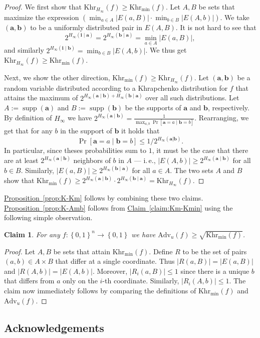\documentclass[11pt]{article}
\numberwithin{equation}{section}
\newtheorem{claim}[theorem]{Claim}
\theoremstyle{definition}
\theoremstyle{plain}
\newcommand{\ie}{i.\,e.}
\newcommand{\expref}[2]{\hyperref[#2]{#1~\ref{#2}}}
\theoremstyle{definition}\newtheorem{notation}[theorem]{Notation}\theoremstyle{plain}
\newcommand{\B}{\left\{ 0,1 \right \}}
\renewcommand{\a}{\boldsymbol{a}}
\renewcommand{\b}{\boldsymbol{b}}
\renewcommand{\i}{\boldsymbol{i}}
\newcommand{\Hm}{H_{\infty}}
\newcommand{\K}{\mathrm{Khr}}
\newcommand{\Km}{\K_{\Hm}}
\newcommand{\Kmin}{\K_{\min}}
\newcommand{\Amb}{\mathrm{Adv}_{u}}
\DeclareMathOperator{\supp}{supp}
\theoremstyle{definition}
\theoremstyle{plain}
\begin{document}
\begin{proof}
We first show that $\Km(f)\ge\Kmin(f)$. Let $A,B$ be sets that maximize
the expression $\left(\min_{a\in A}{|E(a,B)|}\cdot\min_{b\in B}{|E(A,b)|}\right)$.
We take $(\a,\b)$ to be a uniformly distributed pair in $E(A,B)$.
It is not hard to see that 
\[
2^{\Hm(\i\mid\a)}=2^{\Hm(\b\mid\a)}=\min_{a\in A}{|E(a,B)|},
\]
and similarly $2^{\Hm(\i\mid\b)}=\min_{b\in B}{|E(A,b)|}$. We thus
get $\Km(f)\ge\Kmin(f)$.

Next, we show the other direction, $\Kmin(f)\ge\Km(f)$. Let $(\a,\b)$
be a random variable distributed according to a Khrapchenko distribution
for $f$ that attains the maximum of $2^{\Hm(\a\mid\b)+\Hm(\b\mid\a)}$
over all such distributions. Let $A:=\supp(\a)$ and $B:=\supp(\b)$
be the supports of $\a$ and $\b$, respectively. By definition of
$\Hm$ we have $2^{\Hm(\a\mid\b)}=\frac{1}{\max_{a,b}\Pr[\a=a\mid\b=b]}$.
Rearranging, we get that for any $b$ in the support of $\b$ it holds
that 
\[
\Pr[\a=a\mid\b=b]\le1/2^{\Hm(\a|\b)}.
\]
In particular, since theses probabilities sum to $1$, it must be
the case that there are at least $2^{\Hm(\a\mid\b)}$ neighbors of
$b$ in $A$ --- \ie, $|E(A,b)|\ge2^{\Hm(\a\mid\b)}$ for all $b\in B$.
Similarly, $|E(a,B)|\ge2^{\Hm(\b\mid\a)}$ for all $a\in A$. The
two sets $A$ and $B$ show that $\Kmin(f)\ge2^{\Hm(\a\mid\b)}\cdot2^{\Hm(\b\mid\a)}=\Km(f)$. 
\end{proof}
\expref{Proposition}{prop:K-Km} follows by combining these two claims. 
\expref{Proposition}{prop:K-Amb} follows
from \expref{Claim}{claim:Km-Kmin} using the following simple observation.
\begin{claim}
\label{claim:Amb-Kmin} For any $f\colon\B^{n}\to\B$ we have $\Amb(f)\geq\sqrt{\Kmin(f)}$. 
\end{claim}

\begin{proof}
Let $A,B$ be sets that attain $\Kmin(f)$. Define $R$ to be the
set of pairs $(a,b)\in A\times B$ that differ at a single coordinate.
Thus $|R(a,B)|=|E(a,B)|$ and $|R(A,b)|=|E(A,b)|$. Moreover, $|R_{i}(a,B)|\leq1$
since there is a unique $b$ that differs from $a$ only on the $i$-th
coordinate. Similarly, $|R_{i}(A,b)|\leq1$. The claim now immediately
follows by comparing the definitions of $\Kmin(f)$ and $\Amb(f)$. 
\end{proof}

%

\subsection*{Acknowledgements}
\end{document}
